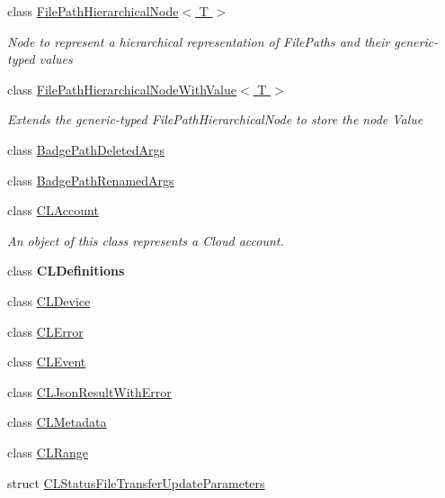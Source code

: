 \begin{DoxyCompactItemize}
class \hyperlink{class_cloud_api_public_1_1_model_1_1_file_path_hierarchical_node_3_01_t_01_4}{File\-Path\-Hierarchical\-Node$<$ T $>$}
\begin{DoxyCompactList}\small\item\em Node to represent a hierarchical representation of File\-Paths and their generic-\/typed values \end{DoxyCompactList}\item 
class \hyperlink{class_cloud_api_public_1_1_model_1_1_file_path_hierarchical_node_with_value_3_01_t_01_4}{File\-Path\-Hierarchical\-Node\-With\-Value$<$ T $>$}
\begin{DoxyCompactList}\small\item\em Extends the generic-\/typed File\-Path\-Hierarchical\-Node to store the node Value \end{DoxyCompactList}\item 
class \hyperlink{class_cloud_api_public_1_1_model_1_1_badge_path_deleted_args}{Badge\-Path\-Deleted\-Args}
\item 
class \hyperlink{class_cloud_api_public_1_1_model_1_1_badge_path_renamed_args}{Badge\-Path\-Renamed\-Args}
\item 
class \hyperlink{class_cloud_api_public_1_1_model_1_1_c_l_account}{C\-L\-Account}
\begin{DoxyCompactList}\small\item\em An object of this class represents a Cloud account. \end{DoxyCompactList}\item 
class {\bfseries C\-L\-Definitions}
\item 
class \hyperlink{class_cloud_api_public_1_1_model_1_1_c_l_device}{C\-L\-Device}
\item 
class \hyperlink{class_cloud_api_public_1_1_model_1_1_c_l_error}{C\-L\-Error}
\item 
class \hyperlink{class_cloud_api_public_1_1_model_1_1_c_l_event}{C\-L\-Event}
\item 
class \hyperlink{class_cloud_api_public_1_1_model_1_1_c_l_json_result_with_error}{C\-L\-Json\-Result\-With\-Error}
\item 
class \hyperlink{class_cloud_api_public_1_1_model_1_1_c_l_metadata}{C\-L\-Metadata}
\item 
class \hyperlink{class_cloud_api_public_1_1_model_1_1_c_l_range}{C\-L\-Range}
\item 
struct \hyperlink{struct_cloud_api_public_1_1_model_1_1_c_l_status_file_transfer_update_parameters}{C\-L\-Status\-File\-Transfer\-Update\-Parameters}

\end{DoxyCompactItemize}
